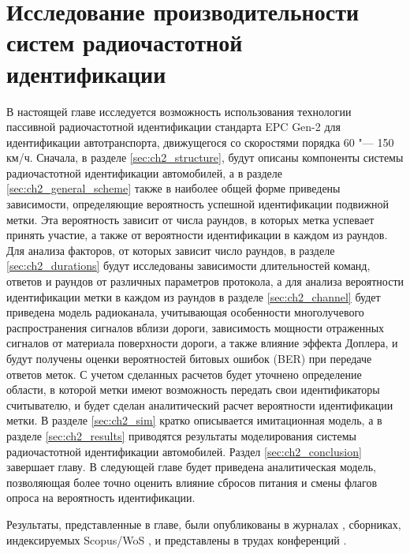 \chapter{Исследование производительности систем радиочастотной идентификации}\label{ch:ch2}

В настоящей главе исследуется возможность использования технологии пассивной радиочастотной идентификации стандарта EPC Gen-2 \cite{StdGen2} для идентификации автотранспорта, движущегося со скоростями порядка 60 "--- 150 км/ч. Сначала, в разделе \ref{sec:ch2_structure}, будут описаны компоненты системы радиочастотной идентификации автомобилей, а в разделе \ref{sec:ch2_general_scheme} также в наиболее общей форме приведены зависимости, определяющие вероятность успешной идентификации подвижной метки. Эта вероятность зависит от числа раундов, в которых метка успевает принять участие, а также от вероятности идентификации в каждом из раундов. Для анализа факторов, от которых зависит число раундов, в разделе \ref{sec:ch2_durations} будут исследованы зависимости длительностей команд, ответов и раундов от различных параметров протокола, а для анализа вероятности идентификации метки в каждом из раундов в разделе \ref{sec:ch2_channel} будет приведена модель радиоканала, учитывающая особенности многолучевого распространения сигналов вблизи дороги, зависимость мощности отраженных сигналов от материала поверхности дороги, а также влияние эффекта Доплера, и будут получены оценки вероятностей битовых ошибок (BER) при передаче ответов меток. С учетом сделанных расчетов будет уточнено определение области, в которой метки имеют возможность передать свои идентификаторы считывателю, и будет сделан аналитический расчет вероятности идентификации метки. В разделе \ref{sec:ch2_sim} кратко описывается имитационная модель, а в разделе \ref{sec:ch2_results} приводятся результаты моделирования системы радиочастотной идентификации автомобилей. Раздел \ref{sec:ch2_conclusion} завершает главу. В следующей главе будет приведена аналитическая модель, позволяющая более точно оценить влияние сбросов питания и смены флагов опроса на вероятность идентификации.

Результаты, представленные в главе, были опубликованы в журналах \cite{RFID_JRFID2017,QS_TCOMM2012,QS_JITCS2013}, сборниках, индексируемых Scopus/WoS \cite{RFID_IEEERFID2017,RFID_DCCN2016_CCIS,RFID_SYNCHROINFO2018}, и представлены в трудах конференций \cite{Fedotov2020, Fedotov2020a, RFID_DCCN2015_RUS,RFID_DCCN2013_RUS}.








